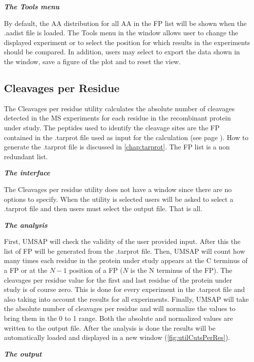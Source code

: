 \textit{\textbf{The Tools menu}}

By default, the AA distribution for all AA in the FP list will be shown when the .aadist file is loaded. The Tools menu in the window allows user to change the displayed experiment or to select the position for which results in the experiments should be compared. In addition, users may select to export the data shown in the window, save a figure of the plot and to reset the view. 

\subsection{Cleavages per Residue}
\label{subsec:utilCutsPerRes}
The Cleavages per residue utility calculates the absolute number of cleavages detected in the MS experiments for each residue in the recombinant protein under study. The peptides used to identify the cleavage sites are the FP contained in the .tarprot file used as input for the calculation (see page \pageref{par:tarprotPIP}). How to generate the .tarprot file is discussed in \autoref{chap:tarprot}. The FP list is a non redundant list.

\textit{\textbf{The interface}}

The Cleavages per residue utility does not have a window since there are no options to specify. When the utility is selected users will be asked to select a .tarprot file and then users must select the output file. That is all.

\textit{\textbf{The analysis}}

First, UMSAP will check the validity of the user provided input. After this the list of FP will be generated from the .tarprot file. Then, UMSAP will count how many times each residue in the protein under study appears at the C terminus of a FP or at the \(N-1\) position of a FP (\(N\) is the N terminus of the FP). The cleavages per residue value for the first and last residue of the protein under study is of course zero. This is done for every experiment in the .tarprot file and also taking into account the results for all experiments. Finally, UMSAP will take the absolute number of cleavages per residue and will normalize the values to bring them in the 0 to 1 range. Both the absolute and normalized values are written to the output file. After the analysis is done the results will be automatically loaded and displayed in a new window (\autoref{fig:utilCutsPerRes}). 

\textit{\textbf{The output}}

